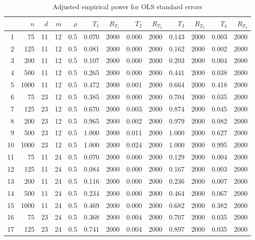 \documentclass{article}
\begin{document}
\begin{table}[ht]
\begin{center}
\caption{Adjusted empirical power for OLS standard errors}
\label{tab:adjpower}
\begin{tabular}{rrrrrrrrrrrrr}
  \hline
 & $n$ & $d$ & $m$ & $\rho$ & $T_1$ & $R_{T_1}$ & $T_2$ & $R_{T_2}$ & $T_3$ & $R_{T_3}$ & $T_4$ & $R_{T_4}$ \\ 
  \hline
1 & 75 & 11 & 12 & 0.5 & 0.070 & 2000 & 0.000 & 2000 & 0.143 & 2000 & 0.003 & 2000 \\ 
  2 & 125 & 11 & 12 & 0.5 & 0.081 & 2000 & 0.000 & 2000 & 0.162 & 2000 & 0.002 & 2000 \\ 
  3 & 200 & 11 & 12 & 0.5 & 0.107 & 2000 & 0.000 & 2000 & 0.203 & 2000 & 0.004 & 2000 \\ 
  4 & 500 & 11 & 12 & 0.5 & 0.265 & 2000 & 0.000 & 2000 & 0.441 & 2000 & 0.038 & 2000 \\ 
  5 & 1000 & 11 & 12 & 0.5 & 0.472 & 2000 & 0.001 & 2000 & 0.664 & 2000 & 0.418 & 2000 \\ 
   \hline
6 & 75 & 23 & 12 & 0.5 & 0.385 & 2000 & 0.000 & 2000 & 0.704 & 2000 & 0.035 & 2000 \\ 
  7 & 125 & 23 & 12 & 0.5 & 0.670 & 2000 & 0.003 & 2000 & 0.874 & 2000 & 0.045 & 2000 \\ 
  8 & 200 & 23 & 12 & 0.5 & 0.965 & 2000 & 0.002 & 2000 & 0.979 & 2000 & 0.082 & 2000 \\ 
  9 & 500 & 23 & 12 & 0.5 & 1.000 & 2000 & 0.011 & 2000 & 1.000 & 2000 & 0.627 & 2000 \\ 
  10 & 1000 & 23 & 12 & 0.5 & 1.000 & 2000 & 0.024 & 2000 & 1.000 & 2000 & 0.995 & 2000 \\ 
   \hline
11 & 75 & 11 & 24 & 0.5 & 0.070 & 2000 & 0.000 & 2000 & 0.129 & 2000 & 0.004 & 2000 \\ 
  12 & 125 & 11 & 24 & 0.5 & 0.084 & 2000 & 0.000 & 2000 & 0.167 & 2000 & 0.003 & 2000 \\ 
  13 & 200 & 11 & 24 & 0.5 & 0.116 & 2000 & 0.000 & 2000 & 0.236 & 2000 & 0.007 & 2000 \\ 
  14 & 500 & 11 & 24 & 0.5 & 0.234 & 2000 & 0.000 & 2000 & 0.464 & 2000 & 0.067 & 2000 \\ 
  15 & 1000 & 11 & 24 & 0.5 & 0.469 & 2000 & 0.000 & 2000 & 0.682 & 2000 & 0.382 & 2000 \\ 
   \hline
16 & 75 & 23 & 24 & 0.5 & 0.368 & 2000 & 0.004 & 2000 & 0.707 & 2000 & 0.035 & 2000 \\ 
  17 & 125 & 23 & 24 & 0.5 & 0.741 & 2000 & 0.004 & 2000 & 0.897 & 2000 & 0.035 & 2000 \\ 

\end{tabular}
\end{center}
\end{table}
\end{document}

